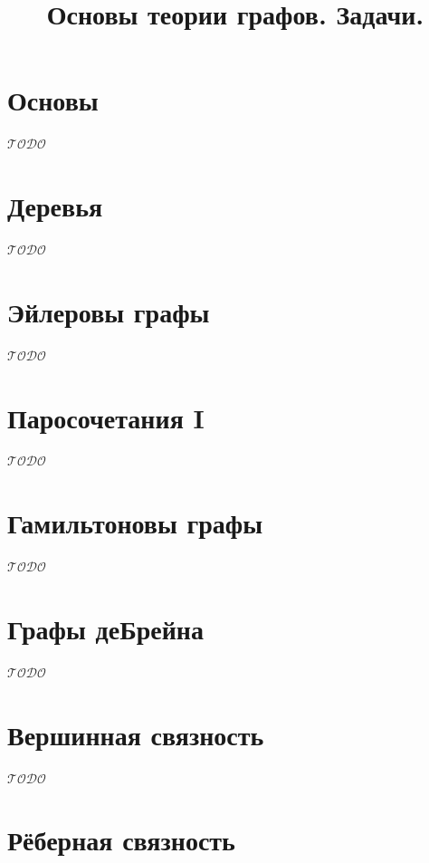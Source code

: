 \documentclass[a4paper,12pt]{article}
\title{Основы теории графов. Задачи.}
\author{}
\date{}
\theoremstyle{remark}
\def\iiTODO{\guillemotleft$\mathcal{TODO}$\guillemotright\textellipsis}
\begin{document}
\maketitle



\section{Основы}

\iiTODO



\section{Деревья}

\iiTODO



\section{Эйлеровы графы}

\iiTODO



\section{Паросочетания I}

\iiTODO



\section{Гамильтоновы графы}

\iiTODO



\section{Графы деБрейна}

\iiTODO



\section{Вершинная связность}

\iiTODO




\section{Рёберная связность}
\end{document}
